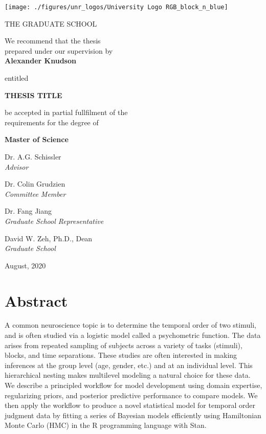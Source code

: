 \documentclass[11pt, oneside, openany]{scrbook}
\begin{document}
\begin{center}

\texttt{[image: ./figures/unr\_logos/University Logo RGB\_block\_n\_blue]}

THE GRADUATE SCHOOL

\vspace{1em}
We recommend that the thesis \\
prepared under our supervision by\\

\vspace{1em}
\textbf{Alexander Knudson}

\vspace{1em}
entitled

\textbf{THESIS TITLE}

\vspace{2em}
be accepted in partial fullfilment of the \\
requirements for the degree of

\vspace{1em}
\textbf{Master of Science}

\vspace{1em}
Dr. A.G. Schissler \\
\textit{Advisor}

\vspace{1em}
Dr. Colin Grudzien\\
\textit{Committee Member}

\vspace{1em}
Dr. Fang Jiang \\
\textit{Graduate School Representative}

\vspace{1em}
David W. Zeh, Ph.D., Dean \\
\textit{Graduate School}

\vspace{1em}
August, 2020
\end{center}


\newpage
\setcounter{page}{1} %
\section*{Abstract}

A common neuroscience topic is to determine the temporal order of two stimuli, and is often studied via a logistic model called a psychometric function. The data arises from repeated sampling of subjects across a variety of tasks (stimuli), blocks, and time separations. These studies are often interested in making inferences at the group level (age, gender, etc.) and at an individual level. This hierarchical nesting makes multilevel modeling a natural choice for these data. We describe a principled workflow for model development using domain expertise, regularizing priors, and posterior predictive performance to compare models. We then apply the workflow to produce a novel statistical model for temporal order judgment data by fitting a series of Bayesian models efficiently using Hamiltonian Monte Carlo (HMC) in the R programming language with Stan.
\end{document}
